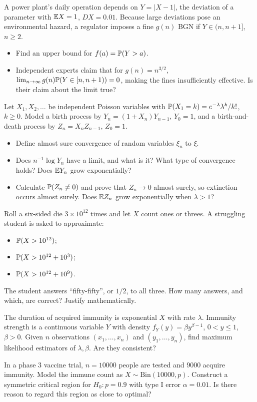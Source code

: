 \documentclass[a4paper]{report}
\begin{document}
\begin{problem}
A power plant's daily operation depends on $Y=|X-1|$, the deviation of a parameter with $\E X=1$, $DX=0.01$. Because large deviations pose an environmental hazard, a regulator imposes a fine $g(n)$ BGN if $Y\in(n,n+1]$, $n\geq2$.
\begin{itemize}
\item Find an upper bound for $f(a)=\P(Y>a)$.
\item Independent experts claim that for $g(n)=n^{3/2}$, $\lim_{n\to\infty}g(n)\P(Y\in[n,n+1))=0$, making the fines insufficiently effective. Is their claim about the limit true?
\end{itemize}
\end{problem}
\begin{problem}
Let $X_1,X_2,\ldots$ be independent Poisson variables with $\P(X_1=k)=e^{-\lambda}\lambda^k/k!$, $k\geq0$. Model a birth process by $Y_n=(1+X_n)Y_{n-1}$, $Y_0=1$, and a birth-and-death process by $Z_n=X_nZ_{n-1}$, $Z_0=1$.
\begin{itemize}
\item Define almost sure convergence of random variables $\xi_n$ to $\xi$.
\item Does $n^{-1}\log Y_n$ have a limit, and what is it? What type of convergence holds? Does $\E Y_n$ grow exponentially?
\item Calculate $\P(Z_n\ne0)$ and prove that $Z_n\to0$ almost surely, so extinction occurs almost surely. Does $\E Z_n$ grow exponentially when $\lambda>1$?
\end{itemize}
\end{problem}
\begin{problem}
Roll a six-sided die $3\times10^{12}$ times and let $X$ count ones or threes. A struggling student is asked to approximate:
\begin{itemize}
\item $\P(X>10^{12})$;
\item $\P(X>10^{12}+10^3)$;
\item $\P(X>10^{12}+10^9)$.
\end{itemize}
The student answers ``fifty-fifty'', or $1/2$, to all three. How many answers, and which, are correct? Justify mathematically.
\end{problem}
\begin{problem}
The duration of acquired immunity is exponential $X$ with rate $\lambda$. Immunity strength is a continuous variable $Y$ with density $f_Y(y)=\beta y^{\beta-1}$, $0<y\leq1$, $\beta>0$. Given $n$ observations $(x_1,\ldots,x_n)$ and $(y_1,\ldots,y_n)$, find maximum likelihood estimators of $\lambda,\beta$. Are they consistent?
\end{problem}
\begin{problem}
In a phase 3 vaccine trial, $n=10000$ people are tested and 9000 acquire immunity. Model the immune count as $X\sim\mathrm{Bin}(10000,p)$. Construct a symmetric critical region for $H_0:p=0.9$ with type I error $\alpha=0.01$. Is there reason to regard this region as close to optimal?
\end{problem}
\end{document}
